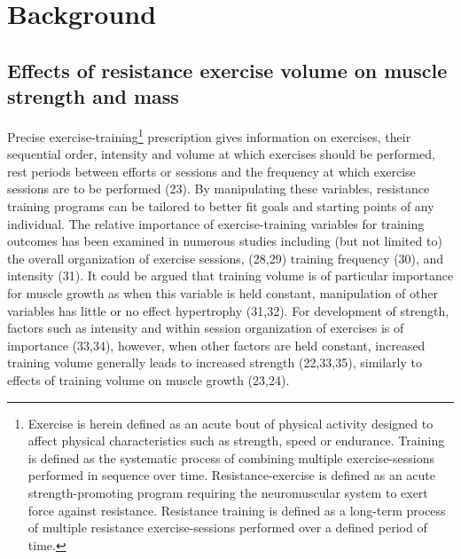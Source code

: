 \documentclass[twoside,10pt]{gihclass} %
\begin{document}
\hypertarget{background}{%
\chapter{Background}\label{background}}

\hypertarget{effects-of-resistance-exercise-volume-on-muscle-strength-and-mass}{%
\section{Effects of resistance exercise volume on muscle strength and mass}\label{effects-of-resistance-exercise-volume-on-muscle-strength-and-mass}}

Precise exercise-training\footnote{Exercise is herein defined as an acute bout of physical activity designed to affect physical characteristics such as strength, speed or endurance. Training is defined as the systematic process of combining multiple exercise-sessions performed in sequence over time. Resistance-exercise is defined as an acute strength-promoting program requiring the neuromuscular system to exert force against resistance. Resistance training is defined as a long-term process of multiple resistance exercise-sessions performed over a defined period of time.}
prescription gives information on exercises, their sequential order, intensity and volume at which exercises should be performed, rest periods between efforts or sessions and the frequency at which exercise sessions are to be performed
(23).
By manipulating these variables, resistance training programs can be tailored to better fit goals and starting points of any individual.
The relative importance of exercise-training variables for training outcomes has been examined in numerous studies including (but not limited to) the overall organization of exercise sessions,
(28,29)
training frequency
(30),
and intensity
(31).
It could be argued that training volume is of particular importance for muscle growth as when this variable is held constant, manipulation of other variables has little or no effect hypertrophy
(31,32).
For development of strength, factors such as intensity and within session organization of exercises is of importance
(33,34),
however, when other factors are held constant, increased training volume generally leads to increased strength
(22,33,35),
similarly to effects of training volume on muscle growth
(23,24).
\end{document}
